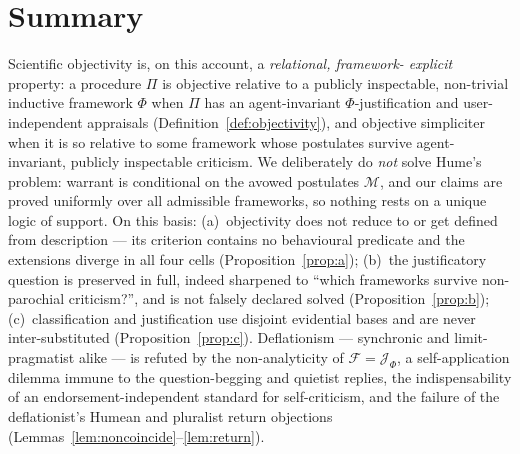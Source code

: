 \documentclass{amsart}
\theoremstyle{definition}
\theoremstyle{plain}
\theoremstyle{remark}
\begin{document}
\section{Summary}

Scientific objectivity is, on this account, a \emph{relational, framework-
explicit} property: a procedure $\Pi$ is objective relative to a publicly
inspectable, non-trivial inductive framework $\Phi$ when $\Pi$ has an
agent-invariant $\Phi$-justification and user-independent appraisals
(Definition~\ref{def:objectivity}), and objective simpliciter when it is so
relative to some framework whose postulates survive agent-invariant, publicly
inspectable criticism. We deliberately do \emph{not} solve Hume's problem:
warrant is conditional on the avowed postulates $\mathcal{M}$, and our claims
are proved uniformly over all admissible frameworks, so nothing rests on a
unique logic of support. On this basis: (a)~objectivity does not reduce to or
get defined from description --- its criterion contains no behavioural
predicate and the extensions diverge in all four cells
(Proposition~\ref{prop:a}); (b)~the justificatory question is preserved in full,
indeed sharpened to ``which frameworks survive non-parochial criticism?'', and
is not falsely declared solved (Proposition~\ref{prop:b}); (c)~classification
and justification use disjoint evidential bases and are never inter-substituted
(Proposition~\ref{prop:c}). Deflationism --- synchronic and limit-pragmatist
alike --- is refuted by the non-analyticity of $\mathcal{F}=\mathcal{J}_\Phi$, a
self-application dilemma immune to the question-begging and quietist replies,
the indispensability of an endorsement-independent standard for self-criticism,
and the failure of the deflationist's Humean and pluralist return objections
(Lemmas~\ref{lem:noncoincide}--\ref{lem:return}).
\end{document}
